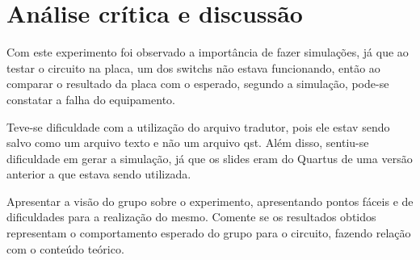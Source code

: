 \chapter{Análise crítica e discussão}
Com este experimento foi observado a importância de fazer simulações, já que ao testar o circuito na placa,
um dos switchs não estava funcionando, então ao comparar o resultado da placa com o esperado,
 segundo a simulação, pode-se constatar a falha do equipamento.

 Teve-se dificuldade com a utilização do arquivo tradutor, pois ele estav sendo salvo como um arquivo texto
 e não um arquivo qst. Além disso, sentiu-se dificuldade em gerar a simulação, já que os slides eram do Quartus
 de uma versão anterior a que estava sendo utilizada.

Apresentar  a  visão do  grupo  sobre  o  experimento,  apresentando  pontos  fáceis  e
de  dificuldades  para  a  realização  do  mesmo.  Comente  se  os  resultados  obtidos
representam  o  comportamento  esperado   do   grupo   para  o   circuito,   fazendo
relação com o conteúdo teórico.
